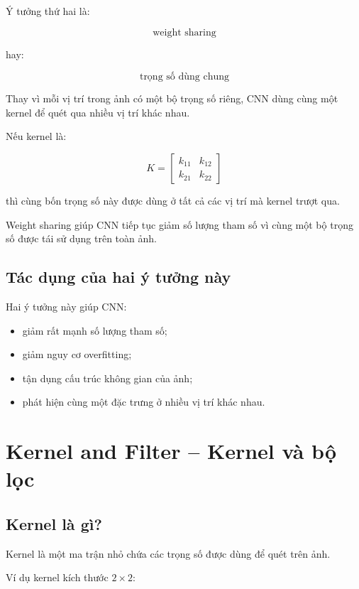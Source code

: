 Ý tưởng thứ hai là:

\[
    \text{weight sharing}
\]

hay:

\[
    \text{trọng số dùng chung}
\]

Thay vì mỗi vị trí trong ảnh có một bộ trọng số riêng, CNN dùng cùng một kernel để quét qua nhiều vị trí khác nhau.

Nếu kernel là:

\[
    K =
    \begin{bmatrix}
    k_{11} & k_{12}\\
    k_{21} & k_{22}
    \end{bmatrix}
\]

thì cùng bốn trọng số này được dùng ở tất cả các vị trí mà kernel trượt qua.

\begin{ghinho}
Weight sharing giúp CNN tiếp tục giảm số lượng tham số vì cùng một bộ trọng số được tái sử dụng trên toàn ảnh.
\end{ghinho}

\subsection{Tác dụng của hai ý tưởng này}

Hai ý tưởng này giúp CNN:

\begin{itemize}
    \item giảm rất mạnh số lượng tham số;
    \item giảm nguy cơ overfitting;
    \item tận dụng cấu trúc không gian của ảnh;
    \item phát hiện cùng một đặc trưng ở nhiều vị trí khác nhau.
\end{itemize}

\section{Kernel and Filter -- Kernel và bộ lọc}

\subsection{Kernel là gì?}

Kernel là một ma trận nhỏ chứa các trọng số được dùng để quét trên ảnh.

Ví dụ kernel kích thước $2 \times 2$:

